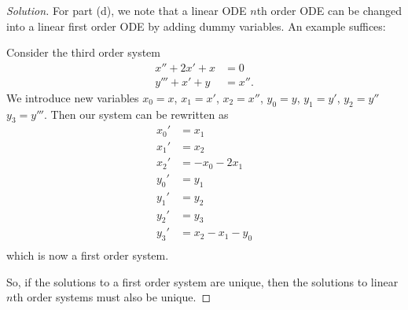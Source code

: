 \documentclass[Shifrin_Solutions_Spring_2015]{subfiles}
\begin{document}
\begin{proof}[Solution]
For part (d), we note that a linear ODE $n$th order ODE can be changed into a linear first order ODE by adding dummy variables. An example suffices:

Consider the third order system
\begin{align*}
x'' + 2x' +x  & = 0 \\
y''' + x' +y & = x'' .
\end{align*}
We introduce new variables $x_0 = x$, $x_1 = x'$, $x_2 = x''$, $y_0 = y$, $y_1=y'$, $y_2 = y''$ $y_3 = y'''$. Then our system can be rewritten as
\begin{align*}
x_0' & = x_1 \\
x_1' & = x_2 \\
x_2' & = -x_0 - 2x_1 \\
y_0' & = y_1 \\
y_1' & = y_2 \\
y_2' & = y_3 \\
y_3' & = x_2 - x_1 - y_0 \\
\end{align*}
which is now a first order system.

So, if the solutions to a first order system are unique, then the solutions to linear $n$th order systems must also be unique.


\end{proof}
\end{document}
